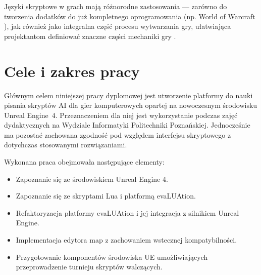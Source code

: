 Języki skryptowe w grach mają różnorodne zastosowania --- zarówno do tworzenia dodatków do już kompletnego oprogramowania (np. World of Warcraft \cite{wowlua}), jak również jako integralna część procesu wytwarzania gry, ułatwiająca projektantom definiować znaczne części mechaniki gry \cite{oreilly}.

\section{Cele i zakres pracy}

Głównym celem niniejszej pracy dyplomowej jest utworzenie platformy do nauki pisania skryptów AI dla gier komputerowych opartej na nowoczesnym środowisku Unreal Engine~4. Przeznaczeniem dla niej jest wykorzystanie podczas zajęć dydaktycznych na Wydziale Informatyki Politechniki Poznańskiej. Jednocześnie ma pozostać zachowana zgodność pod względem interfejsu skryptowego z dotychczas stosowanymi rozwiązaniami.

Wykonana praca obejmowała następujące elementy:

\begin{itemize}
    \item	Zapoznanie się ze środowiskiem Unreal Engine 4.
    \item	Zapoznanie się ze skryptami Lua i platformą evaLUAtion.
    \item	Refaktoryzacja platformy evaLUAtion i jej integracja z silnikiem Unreal Engine.
    \item	Implementacja edytora map z zachowaniem wstecznej kompatybilności.
    \item	Przygotowanie komponentów środowiska UE umożliwiających przeprowadzenie turnieju  skryptów walczących.

\end{itemize}

